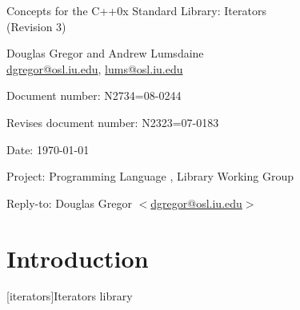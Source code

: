\documentclass[american,twoside]{book}
\begin{document}
\raggedbottom

\begin{titlepage}
\begin{center}
\huge
Concepts for the C++0x Standard Library: Iterators \\
(Revision 3)
\vspace{0.5in}

\normalsize
Douglas Gregor and Andrew Lumsdaine \\
\href{mailto:dgregor@osl.iu.edu}{dgregor@osl.iu.edu}, \href{mailto:lums@osl.iu.edu}{lums@osl.iu.edu}
\end{center}

\vspace{1in}
\par\noindent Document number: N2734=08-0244 \vspace{-6pt}
\par\noindent Revises document number: N2323=07-0183 \vspace{-6pt}
\par\noindent Date: \today\vspace{-6pt}
\par\noindent Project: Programming Language \Cpp{}, Library Working Group\vspace{-6pt}
\par\noindent Reply-to: Douglas Gregor $<$\href{mailto:dgregor@osl.iu.edu}{dgregor@osl.iu.edu}$>$\vspace{-6pt}

\section*{Introduction}
\end{titlepage}

\pagestyle{fancy}
\fancyhead[LE,RO]{\textbf{\rightmark}}
\fancyhead[RE]{\textbf{\leftmark\hspace{1em}\thepage}}
\fancyhead[LO]{\textbf{\thepage\hspace{1em}\leftmark}}


\renewcommand{\sectionmark}[1]{\markright{\thesection\hspace{1em}#1}}
\renewcommand{\chaptermark}[1]{\markboth{#1}{}}

\setcounter{chapter}{23}
[iterators]{Iterators library}
\end{document}
